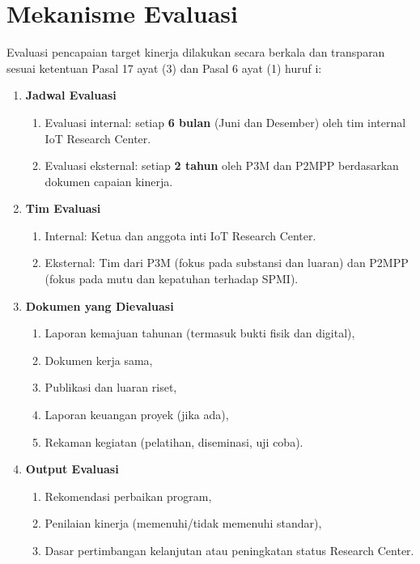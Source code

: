 \documentclass[12pt,a4paper]{article}
\begin{document}
\section{Mekanisme Evaluasi}

Evaluasi pencapaian target kinerja dilakukan secara berkala dan transparan sesuai ketentuan Pasal 17 ayat (3) dan Pasal 6 ayat (1) huruf i:

\begin{enumerate}[leftmargin=*]
    \item \textbf{Jadwal Evaluasi}
          \begin{enumerate}
              \item Evaluasi internal: setiap \textbf{6 bulan} (Juni dan Desember) oleh tim internal IoT Research Center.
              \item Evaluasi eksternal: setiap \textbf{2 tahun} oleh P3M dan P2MPP berdasarkan dokumen capaian kinerja.
          \end{enumerate}

    \item \textbf{Tim Evaluasi}
          \begin{enumerate}
              \item Internal: Ketua dan anggota inti IoT Research Center.
              \item Eksternal: Tim dari P3M (fokus pada substansi dan luaran) dan P2MPP (fokus pada mutu dan kepatuhan terhadap SPMI).
          \end{enumerate}

    \item \textbf{Dokumen yang Dievaluasi}
          \begin{enumerate}
              \item Laporan kemajuan tahunan (termasuk bukti fisik dan digital),
              \item Dokumen kerja sama,
              \item Publikasi dan luaran riset,
              \item Laporan keuangan proyek (jika ada),
              \item Rekaman kegiatan (pelatihan, diseminasi, uji coba).
          \end{enumerate}

    \item \textbf{Output Evaluasi}
          \begin{enumerate}
              \item Rekomendasi perbaikan program,
              \item Penilaian kinerja (memenuhi/tidak memenuhi standar),
              \item Dasar pertimbangan kelanjutan atau peningkatan status Research Center.
          \end{enumerate}
\end{enumerate}
\end{document}
